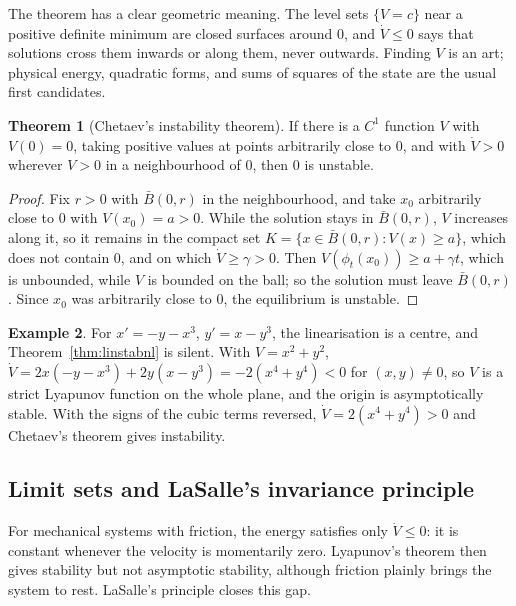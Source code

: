 \documentclass[11pt,a4paper]{article}
\numberwithin{equation}{section}
\theoremstyle{definition}
\newtheorem{thm}{Theorem}[subsection]
\newtheorem{exa}[thm]{Example}
\begin{document}
The theorem has a clear geometric meaning. The level sets $\{V = c\}$ near a positive definite minimum are closed surfaces around $0$, and $\dot V \leq 0$ says that solutions cross them inwards or along
them, never outwards. Finding $V$ is an art; physical energy, quadratic forms, and sums of squares of the state are the usual first candidates.

\begin{thm}[Chetaev's instability theorem]
\label{thm:chetaev}
If there is a $C^1$ function $V$ with $V(0) = 0$, taking positive values at points arbitrarily close to $0$, and with $\dot V > 0$ wherever $V > 0$ in a neighbourhood of $0$, then $0$ is unstable.
\end{thm}

\begin{proof}
Fix $r > 0$ with $\bar B(0, r)$ in the neighbourhood, and take $x_0$ arbitrarily close to $0$ with $V(x_0) = a > 0$. While the solution stays in $\bar B(0, r)$, $V$ increases along it, so it remains in the compact set
$K = \{x \in \bar B(0, r) : V(x) \geq a\}$, which does not contain $0$, and on which $\dot V \geq \gamma > 0$. Then $V(\phi_t(x_0)) \geq a + \gamma t$, which is unbounded, while $V$ is bounded on the ball; so the solution must leave $\bar B(0, r)$.
Since $x_0$ was arbitrarily close to $0$, the equilibrium is unstable.
\end{proof}

\begin{exa}
\label{ex:lyapcubic}
For $x' = -y - x^3$, $y' = x - y^3$, the linearisation is a centre, and Theorem~\ref{thm:linstabnl} is silent. With $V = x^2 + y^2$, $\dot V = 2x(-y - x^3) + 2y(x - y^3) = -2(x^4 + y^4) < 0$ for $(x, y) \neq 0$, so $V$ is a strict
Lyapunov function on the whole plane, and the origin is asymptotically stable. With the signs of the cubic terms reversed, $\dot V = 2(x^4 + y^4) > 0$ and Chetaev's theorem gives instability.
\end{exa}

\subsection{Limit sets and LaSalle's invariance principle}
\label{ssec:lasalle}

For mechanical systems with friction, the energy satisfies only $\dot V \leq 0$: it is constant whenever the velocity is momentarily zero. Lyapunov's theorem then gives stability but not
asymptotic stability, although friction plainly brings the system to rest. LaSalle's principle closes this gap.
\end{document}
